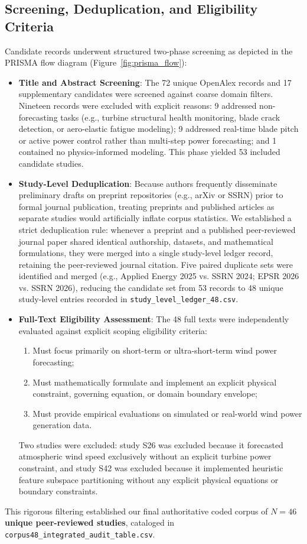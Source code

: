 \documentclass[preprint,3p,times]{elsarticle}
\begin{document}
\subsection{Screening, Deduplication, and Eligibility Criteria}
Candidate records underwent structured two-phase screening as depicted in the PRISMA flow diagram (Figure~\ref{fig:prisma_flow}):
\begin{itemize}[leftmargin=1.5em]
    \item \textbf{Title and Abstract Screening}: The 72 unique OpenAlex records and 17 supplementary candidates were screened against coarse domain filters. Nineteen records were excluded with explicit reasons: 9 addressed non-forecasting tasks (e.g., turbine structural health monitoring, blade crack detection, or aero-elastic fatigue modeling); 9 addressed real-time blade pitch or active power control rather than multi-step power forecasting; and 1 contained no physics-informed modeling. This phase yielded 53 included candidate studies.
    \item \textbf{Study-Level Deduplication}: Because authors frequently disseminate preliminary drafts on preprint repositories (e.g., arXiv or SSRN) prior to formal journal publication, treating preprints and published articles as separate studies would artificially inflate corpus statistics. We established a strict deduplication rule: whenever a preprint and a published peer-reviewed journal paper shared identical authorship, datasets, and mathematical formulations, they were merged into a single study-level ledger record, retaining the peer-reviewed journal citation. Five paired duplicate sets were identified and merged (e.g., Applied Energy 2025 vs. SSRN 2024; EPSR 2026 vs. SSRN 2026), reducing the candidate set from 53 records to 48 unique study-level entries recorded in \texttt{study\_level\_ledger\_48.csv}.
    \item \textbf{Full-Text Eligibility Assessment}: The 48 full texts were independently evaluated against explicit scoping eligibility criteria:
    \begin{enumerate}[label=(\arabic*)]
        \item Must focus primarily on short-term or ultra-short-term wind power forecasting;
        \item Must mathematically formulate and implement an explicit physical constraint, governing equation, or domain boundary envelope;
        \item Must provide empirical evaluations on simulated or real-world wind power generation data.
    \end{enumerate}
    Two studies were excluded: study S26 was excluded because it forecasted atmospheric wind speed exclusively without an explicit turbine power constraint, and study S42 was excluded because it implemented heuristic feature subspace partitioning without any explicit physical equations or boundary constraints.
\end{itemize}
This rigorous filtering established our final authoritative coded corpus of \textbf{$N=46$ unique peer-reviewed studies}, cataloged in \texttt{corpus48\_integrated\_audit\_table.csv}.
\end{document}
